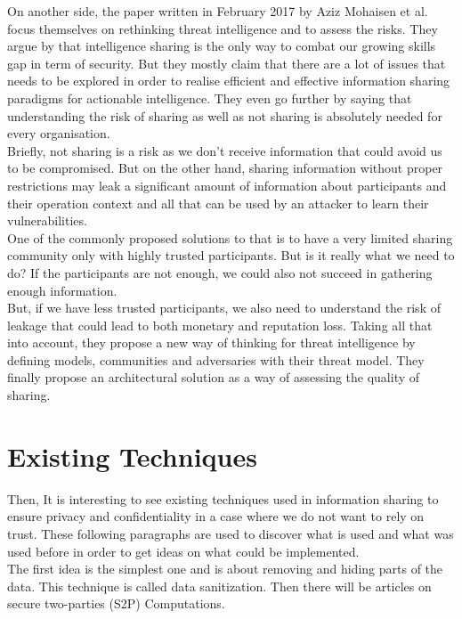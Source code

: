 \documentclass{eplmastersthesis}
\begin{document}
On another side, the paper written in February 2017 by Aziz Mohaisen et al. \cite{mohaisen2017rethinking} focus themselves on rethinking threat intelligence and to assess the risks. They argue by \cite{MalikThreat} that intelligence sharing is the only way to combat our growing skills gap in term of security. But they mostly claim that there are a lot of issues that needs to be explored in order to realise efficient and effective information sharing paradigms for actionable intelligence. They even go further by saying that understanding the risk of sharing as well as not sharing is absolutely needed for every organisation.\\
Briefly, not sharing is a risk as we don't receive information that could avoid us to be compromised. But on the other hand, sharing information without proper restrictions may leak a significant amount of information about participants and their operation context and all that can be used by an attacker to learn their vulnerabilities.\\
One of the commonly proposed solutions to that is to have a very limited sharing community only with highly trusted participants. But is it really what we need to do? If the participants are not enough, we could also not succeed in gathering enough information.\\
But, if we have less trusted participants, we also need to understand the risk of leakage that could lead to both monetary and reputation loss. Taking all that into account, they propose a new way of thinking for threat intelligence by defining models, communities and adversaries with their threat model.
They finally propose an architectural solution as a way of assessing the quality of sharing.

\section{Existing Techniques}
Then, It is interesting to see existing techniques used in information sharing to ensure privacy and confidentiality in a case where we do not want to rely on trust. These following paragraphs are used to discover what is used and what was used before in order to get ideas on what could be implemented.\\

The first idea is the simplest one and is about removing and hiding parts of the data. This technique is called data sanitization. Then there will be articles on secure two-parties (S2P) Computations.\\
\end{document}
